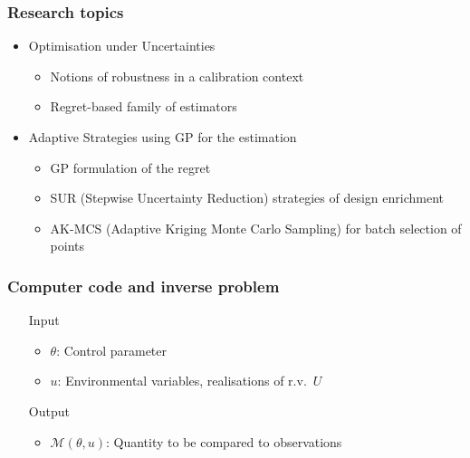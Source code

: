 \documentclass[11pt]{beamer}
\newcommand{\kk}{\theta}
\newcommand{\uu}{u}
\newcommand{\UU}{U}
\begin{document}


\begin{frame}
  \frametitle{Research topics}
  \begin{itemize}
  \item Optimisation under Uncertainties
    \begin{itemize}
    \item Notions of robustness in a calibration context
    \item Regret-based family of estimators
    \end{itemize}


    
  \item Adaptive Strategies using GP for the estimation
    \begin{itemize}
    \item GP formulation of the regret
    \item SUR (Stepwise Uncertainty Reduction) strategies of design enrichment
    \item AK-MCS (Adaptive Kriging Monte Carlo Sampling) for batch selection of points
    \end{itemize}
  \end{itemize}
\end{frame}

\begin{frame}[t]
\frametitle{Computer code and inverse problem}
\begin{itemize}
	\item[Input] 
	\begin{itemize}
		\item $\kk$: Control parameter
		\item $\uu$: Environmental variables, realisations of r.v.\ $\UU$
	\end{itemize}
	\item[Output] \begin{itemize}
          \item $\mathcal{M}(\kk,\uu)$: Quantity to be compared to observations%
	\end{itemize}
      \end{itemize}
      \vfill
      {}
    \end{frame}
\end{document}
